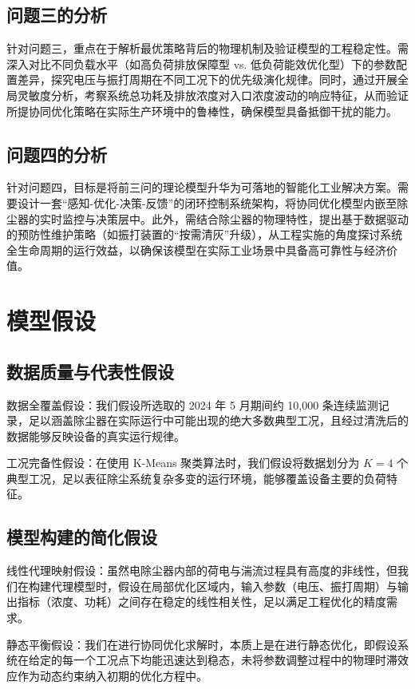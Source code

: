 \documentclass[UTF8, a4paper]{ctexart}
\begin{document}
\subsection{问题三的分析}
针对问题三，重点在于解析最优策略背后的物理机制及验证模型的工程稳定性。需深入对比不同负载水平（如高负荷排放保障型 vs. 低负荷能效优化型）下的参数配置差异，探究电压与振打周期在不同工况下的优先级演化规律。同时，通过开展全局灵敏度分析，考察系统总功耗及排放浓度对入口浓度波动的响应特征，从而验证所提协同优化策略在实际生产环境中的鲁棒性，确保模型具备抵御干扰的能力。
\subsection{问题四的分析}
针对问题四，目标是将前三问的理论模型升华为可落地的智能化工业解决方案。需要设计一套“感知-优化-决策-反馈”的闭环控制系统架构，将协同优化模型内嵌至除尘器的实时监控与决策层中。此外，需结合除尘器的物理特性，提出基于数据驱动的预防性维护策略（如振打装置的“按需清灰”升级），从工程实施的角度探讨系统全生命周期的运行效益，以确保该模型在实际工业场景中具备高可靠性与经济价值。
\section{模型假设}

\subsection{数据质量与代表性假设}

数据全覆盖假设：我们假设所选取的 2024 年 5 月期间约 10,000 条连续监测记录，足以涵盖除尘器在实际运行中可能出现的绝大多数典型工况，且经过清洗后的数据能够反映设备的真实运行规律。

工况完备性假设：在使用 K-Means 聚类算法时，我们假设将数据划分为 $K=4$ 个典型工况，足以表征除尘系统复杂多变的运行环境，能够覆盖设备主要的负荷特征。

\subsection{模型构建的简化假设}

线性代理映射假设：虽然电除尘器内部的荷电与湍流过程具有高度的非线性，但我们在构建代理模型时，假设在局部优化区域内，输入参数（电压、振打周期）与输出指标（浓度、功耗）之间存在稳定的线性相关性，足以满足工程优化的精度需求。

静态平衡假设：我们在进行协同优化求解时，本质上是在进行静态优化，即假设系统在给定的每一个工况点下均能迅速达到稳态，未将参数调整过程中的物理时滞效应作为动态约束纳入初期的优化方程中。
\end{document}
